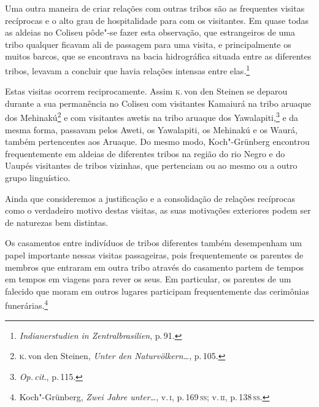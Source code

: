 Uma outra maneira de criar relações com outras tribos são as frequentes
visitas recíprocas e o alto grau de hospitalidade para com os
visitantes. Em quase todas as aldeias no Coliseu pôde"-se fazer esta
observação, que estrangeiros de uma tribo qualquer ficavam ali de
passagem para uma visita, e principalmente os muitos barcos, que se
encontrava na bacia hidrográfica situada entre as diferentes tribos,
levavam a concluir que havia relações intensas entre elas.\footnote{\textit{Indianerstudien
  in Zentralbrasilien}, p.\,91.}

Estas visitas ocorrem reciprocamente. Assim \textsc{k}.\,von den Steinen se
deparou durante a sua permanência no Coliseu com visitantes Kamaiurá na
tribo aruaque dos Mehinakú\footnote{\textsc{k}.\,von den Steinen, \textit{Unter den Naturvölkern\ldots}, p.\,105.} e com visitantes awetis na
tribo aruaque dos Yawalapiti,\footnote{\textit{Op.\,cit}., p.\,115.} e da mesma
forma, passavam pelos Aweti, os Yawalapiti, os Mehinakú e os Waurá,
também pertencentes aos Aruaque. Do mesmo modo, Koch"-Grünberg encontrou
frequentemente em aldeias de diferentes tribos na região do rio Negro e
do Uaupés visitantes de tribos vizinhas, que pertenciam ou ao mesmo ou a
outro grupo linguístico.

Ainda que consideremos a justificação e a consolidação de relações
recíprocas como o verdadeiro motivo destas visitas, as suas motivações
exteriores podem ser de naturezas bem distintas.

{Os casamentos entre indivíduos de tribos diferentes também desempenham
um papel importante nessas visitas passageiras, pois frequentemente os
parentes de membros que entraram em outra tribo através do casamento
partem de tempos em tempos em viagens para rever os seus. Em particular,
os parentes de um falecido que moram em outros lugares participam
frequentemente das cerimônias funerárias.\footnote{Koch"-Grünberg,
  \textit{Zwei Jahre unter\ldots}, v.\,\textsc{i}, p.\,169\,\textsc{ss}; v.\,\textsc{ii}, p.\,138\,\textsc{ss}.}}

